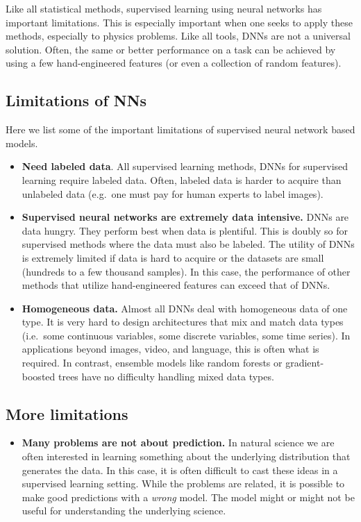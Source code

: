 \documentclass[%
oneside,                 %
final,                   %
10pt]{article}
\begin{document}
Like all statistical methods, supervised learning using neural
networks has important limitations. This is especially important when
one seeks to apply these methods, especially to physics problems. Like
all tools, DNNs are not a universal solution. Often, the same or
better performance on a task can be achieved by using a few
hand-engineered features (or even a collection of random
features). 

\subsection{Limitations of NNs}

Here we list some of the important limitations of supervised neural network based models. 

\begin{itemize}
\item \textbf{Need labeled data}. All supervised learning methods, DNNs for supervised learning require labeled data. Often, labeled data is harder to acquire than unlabeled data (e.g.~one must pay for human experts to label images).

\item \textbf{Supervised neural networks are extremely data intensive.} DNNs are data hungry. They perform best when data is plentiful. This is doubly so for supervised methods where the data must also be labeled. The utility of DNNs is extremely limited if data is hard to acquire or the datasets are small (hundreds to a few thousand samples). In this case, the performance of other methods that utilize hand-engineered features can exceed that of DNNs.

\item \textbf{Homogeneous data.} Almost all DNNs deal with homogeneous data of one type. It is very hard to design architectures that mix and match data types (i.e.~some continuous variables, some discrete variables, some time series). In applications beyond images, video, and language, this is often what is required. In contrast, ensemble models like random forests or gradient-boosted trees have no difficulty handling mixed data types.
\end{itemize}

\noindent
\subsection{More limitations}

\begin{itemize}
\item \textbf{Many problems are not about prediction.} In natural science we are often interested in learning something about the underlying distribution that generates the data. In this case, it is often difficult to cast these ideas in a supervised learning setting. While the problems are related, it is possible to make good predictions with a \emph{wrong} model. The model might or might not be useful for understanding the underlying science.
\end{itemize}
\end{document}
